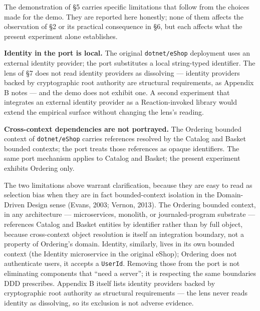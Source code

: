 \documentclass[
]{article}
\newcounter{none} %
\begin{document}
The demonstration of §5 carries specific limitations that follow from
the choices made for the demo. They are reported here honestly; none of
them affects the observation of §2 or its practical consequence in §6,
but each affects what the present experiment alone establishes.

\textbf{Identity in the port is local.} The original
\texttt{dotnet/eShop} deployment uses an external identity provider; the
port substitutes a local string-typed identifier. The lens of §7 does
not read identity providers as dissolving --- identity providers backed
by cryptographic root authority are structural requirements, as Appendix
B notes --- and the demo does not exhibit one. A second experiment that
integrates an external identity provider as a Reaction-invoked library
would extend the empirical surface without changing the lens's reading.

\textbf{Cross-context dependencies are not portrayed.} The Ordering
bounded context of \texttt{dotnet/eShop} carries references resolved by
the Catalog and Basket bounded contexts; the port treats those
references as opaque identifiers. The same port mechanism applies to
Catalog and Basket; the present experiment exhibits Ordering only.

The two limitations above warrant clarification, because they are easy
to read as selection bias when they are in fact bounded-context
isolation in the Domain-Driven Design sense (Evans, 2003; Vernon, 2013).
The Ordering bounded context, in any architecture --- microservices,
monolith, or journaled-program substrate --- references Catalog and
Basket entities by identifier rather than by full object, because
cross-context object resolution is itself an integration boundary, not a
property of Ordering's domain. Identity, similarly, lives in its own
bounded context (the Identity microservice in the original eShop);
Ordering does not authenticate users, it accepts a \texttt{UserId}.
Removing those from the port is not eliminating components that ``need a
server''; it is respecting the same boundaries DDD prescribes. Appendix
B itself lists identity providers backed by cryptographic root authority
as structural requirements --- the lens never reads identity as
dissolving, so its exclusion is not adverse evidence.
\end{document}
